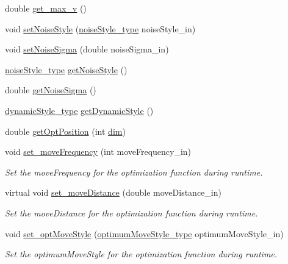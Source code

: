 \begin{CompactItemize}
\item 
double \hyperlink{classFunction_061e6bab528e29d88a41d0958ecbf8dd}{get\_\-max\_\-v} ()
\item 
void \hyperlink{classFunction_5abec82d0206fbcaacbbbe210ff5dfaa}{setNoiseStyle} (\hyperlink{optfunctions_8h_b2443d91d959f9b3a033d74864a28862}{noiseStyle\_\-type} noiseStyle\_\-in)
\item 
void \hyperlink{classFunction_d1077d6767ed99ff6d39adedd86de876}{setNoiseSigma} (double noiseSigma\_\-in)
\item 
\hyperlink{optfunctions_8h_b2443d91d959f9b3a033d74864a28862}{noiseStyle\_\-type} \hyperlink{classFunction_5d1c101ec674fb9c792fe119897693ff}{getNoiseStyle} ()
\item 
double \hyperlink{classFunction_b91fde86475670d74b292373558f8c94}{getNoiseSigma} ()
\item 
\hyperlink{optfunctions_8h_ae9aa3a5dd199a43e77abc2cccf4477e}{dynamicStyle\_\-type} \hyperlink{classFunction_6b8d4f0e5f160a7ead82d28c96046955}{getDynamicStyle} ()
\item 
double \hyperlink{classFunction_d9ee70cdb276c5b7c561cd262eb8fa89}{getOptPosition} (int \hyperlink{classFunction_4b8560408fbefc8a791b70f35959d3a1}{dim})
\item 
void \hyperlink{classFunction_f2ec150f2e16d03e7ecb11f28edae9d7}{set\_\-moveFrequency} (int moveFrequency\_\-in)
\begin{CompactList}\small\item\em Set the moveFrequency for the optimization function during runtime. \item\end{CompactList}\item 
virtual void \hyperlink{classFunction_36161c4387e7d67a916d86863c807e18}{set\_\-moveDistance} (double moveDistance\_\-in)
\begin{CompactList}\small\item\em Set the moveDistance for the optimization function during runtime. \item\end{CompactList}\item 
void \hyperlink{classFunction_926edbee9ecdb70a054375c12d86dbb9}{set\_\-optMoveStyle} (\hyperlink{optfunctions_8h_ba5a89b2e159110d7dd33bced19b11ce}{optimumMoveStyle\_\-type} optimumMoveStyle\_\-in)
\begin{CompactList}\small\item\em Set the optimumMoveStyle for the optimization function during runtime. \item\end{CompactList}\item 

\end{CompactItemize}
